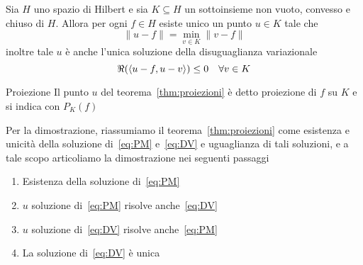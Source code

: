 \begin{theorem}\label{thm:proiezioni}
    Sia \(H\) uno spazio di Hilbert e sia \(K \subseteq H \) un sottoinsieme non
    vuoto, convesso e chiuso di \(H\). Allora per ogni \(f \in H\) esiste unico
    un punto \(u \in K\) tale che 
    \begin{equation}\label{eq:PM}
      \|u - f\| = \min_{v \in K} \|v - f\|
    \end{equation}
    inoltre tale \(u\) è anche l'unica soluzione della disuguaglianza
    variazionale 
    \begin{equation}\label{eq:DV}
      \Re({\left\langle u-f, u-v\right\rangle}) \le 0 \quad \forall v \in K
    \end{equation}
\end{theorem}
\begin{definition}{Proiezione}
    Il punto \(u\) del teorema~\ref{thm:proiezioni} è detto proiezione di \(f\)
    su \(K\) e si indica con \(P_{K}{(f)}\)
\end{definition}
Per la dimostrazione, riassumiamo il teorema~\ref{thm:proiezioni} come esistenza
e unicità della soluzione di~\eqref{eq:PM} e~\eqref{eq:DV} e uguaglianza di tali
soluzioni, e a tale scopo articoliamo la dimostrazione nei seguenti passaggi
\begin{enumerate}[label = \arabic*.]
    \item Esistenza della soluzione di~\eqref{eq:PM}
    \item \(u\) soluzione di~\eqref{eq:PM} risolve anche~\eqref{eq:DV}
    \item \(u\) soluzione di~\eqref{eq:DV} risolve anche~\eqref{eq:PM}
    \item La soluzione di~\eqref{eq:DV} è unica
\end{enumerate}
